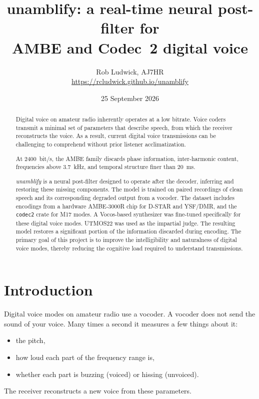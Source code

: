 \documentclass[10pt,twocolumn,a4paper]{article}
\title{\vspace{-8mm}\textbf{unamblify}: a real-time neural post-filter for\\
AMBE and Codec~2 digital voice}
\author{Rob Ludwick, AJ7HR\\[1ex]\normalsize
\url{https://rcludwick.github.io/unamblify}}
\date{25 September 2026}
\begin{document}
\maketitle

\begin{abstract}
  \noindent
  Digital voice on amateur radio inherently operates at a low
  bitrate. Voice coders transmit a minimal set of parameters that
  describe speech, from which the receiver reconstructs the voice. As
  a result, current digital voice transmissions can be challenging to
  comprehend without prior listener acclimatization.

  At \SI{2400}{bit/s}, the AMBE family \cite{griffin1988mbe,hardwick1988mbe}
  discards phase information, inter-harmonic content, frequencies
  above \SI{3.7}{kHz}, and temporal structure finer than \SI{20}{ms}.

  \emph{unamblify} is a neural post-filter designed to operate after
  the decoder, inferring and restoring these missing components. The
  model is trained on paired recordings of clean speech and its
  corresponding degraded output from a vocoder. The dataset includes
  encodings from a hardware AMBE-3000R chip for D-STAR and YSF/DMR,
  and the \texttt{codec2} crate \cite{rowe2010codec2} for M17 modes.
  A Vocos-based \cite{siuzdak2024vocos} synthesizer was fine-tuned
  specifically for these digital voice modes. UTMOS22 \cite{saeki2022utmos} was used as
  the impartial judge.  The resulting model
  restores a significant portion of the information discarded during
  encoding. The primary goal of this project is to improve the
  intelligibility and naturalness of digital voice modes, thereby
  reducing the cognitive load required to understand transmissions.

\end{abstract}

\section{Introduction}
\label{sec:intro}

Digital voice modes on amateur radio use a vocoder. A vocoder does not
send the sound of your voice. Many times a second it measures a few
things about it:
\begin{itemize}\itemsep1pt
  \item the pitch,
  \item how loud each part of the frequency range is,
  \item whether each part is buzzing (voiced) or hissing (unvoiced).
\end{itemize}
The receiver reconstructs a new voice from
these parameters.
\end{document}
